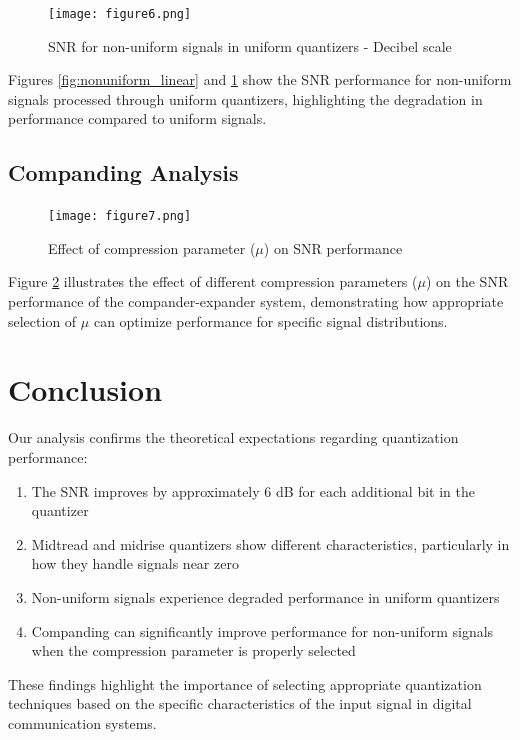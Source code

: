 \documentclass{article}
\begin{document}
\begin{figure}[H]
    \centering
    \texttt{[image: figure6.png]}
    \caption{SNR for non-uniform signals in uniform quantizers - Decibel scale}
    \label{fig:nonuniform_db}
\end{figure}

Figures \ref{fig:nonuniform_linear} and \ref{fig:nonuniform_db} show the SNR performance for non-uniform signals processed through uniform quantizers, highlighting the degradation in performance compared to uniform signals.

\subsection{Companding Analysis}

\begin{figure}[H]
    \centering
    \texttt{[image: figure7.png]}
    \caption{Effect of compression parameter ($\mu$) on SNR performance}
    \label{fig:companding}
\end{figure}

Figure \ref{fig:companding} illustrates the effect of different compression parameters ($\mu$) on the SNR performance of the compander-expander system, demonstrating how appropriate selection of $\mu$ can optimize performance for specific signal distributions.

\section{Conclusion}

Our analysis confirms the theoretical expectations regarding quantization performance:

\begin{enumerate}
    \item The SNR improves by approximately 6 dB for each additional bit in the quantizer
    \item Midtread and midrise quantizers show different characteristics, particularly in how they handle signals near zero
    \item Non-uniform signals experience degraded performance in uniform quantizers
    \item Companding can significantly improve performance for non-uniform signals when the compression parameter is properly selected
\end{enumerate}

These findings highlight the importance of selecting appropriate quantization techniques based on the specific characteristics of the input signal in digital communication systems.
\end{document}
